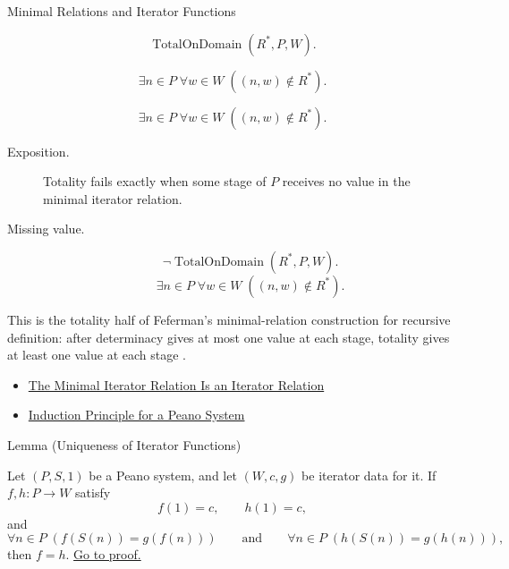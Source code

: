 \begin{topicbox}{Minimal Relations and Iterator Functions}
\begin{remark*}
\[
\operatorname{TotalOnDomain}(R^*,P,W).
\]
\end{remark*}

\begin{remark*}
\[
\exists n\in P\;\forall w\in W\;((n,w)\notin R^*).
\]
\end{remark*}

\begin{remark*}
\[
  \exists n\in P\;\forall w\in W\;((n,w)\notin R^*).
\]
\end{remark*}

\begin{remark*}
\begin{description}
  \item[Exposition.]
  Totality fails exactly when some stage of $P$ receives no value in the
  minimal iterator relation.
  \item[Missing value.]
  \[
  \neg\operatorname{TotalOnDomain}(R^*,P,W).
  \]
  \[
  \exists n\in P\;\forall w\in W\;((n,w)\notin R^*).
  \]
\end{description}
\end{remark*}

\begin{remark*}[Interpretation]
This is the totality half of Feferman's minimal-relation construction for
recursive definition: after determinacy gives at most one value at each stage,
totality gives at least one value at each stage
\citep{FefermanNumberSystems1964}.
\end{remark*}

\begin{dependencies}
\begin{itemize}
  \item \hyperref[lem:iterator-relation-consistency]{The Minimal Iterator Relation Is an Iterator Relation}
  \item \hyperref[thm:induction-principle-for-peano-system]{Induction Principle for a Peano System}
\end{itemize}
\end{dependencies}

\begin{lemmabox}{Lemma (Uniqueness of Iterator Functions)}
\begin{lemma}
\label{lem:uniqueness-of-iterator-functions}
Let $(P,S,1)$ be a Peano system, and let $(W,c,g)$ be iterator data for it. If
$f,h:P\to W$ satisfy
\[
f(1)=c,\qquad h(1)=c,
\]
and
\[
\forall n\in P\;(f(S(n))=g(f(n)))
\qquad\text{and}\qquad
\forall n\in P\;(h(S(n))=g(h(n))),
\]
then $f=h$.
\hyperref[prf:uniqueness-of-iterator-functions]{Go to proof.}
\end{lemma}
\end{lemmabox}


\end{topicbox}
